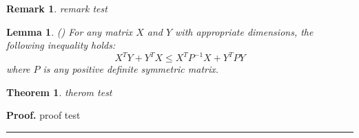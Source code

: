 \documentclass{ieeeaccess}%
\newtheorem{theorem}{Theorem}
\newtheorem{lemma}{Lemma}
\newtheorem{remark}{Remark}
\newenvironment{proof}[1][Proof]{\noindent\textbf{#1.} }{\ \rule{0.5em}{0.5em}}
\begin{document}
\begin{remark}
remark test
\end{remark}

\begin{lemma}
(\cite{lemma}) For any matrix $X$ and $Y$ with appropriate dimensions, the
following inequality holds:%
\begin{equation}
X^{T}Y+Y^{T}X\leq X^{T}P^{-1}X+Y^{T}PY \label{lemma inequality}%
\end{equation}
where $P$ is any positive definite symmetric matrix.
\end{lemma}

\begin{theorem}
therom test
\end{theorem}

\begin{proof}
proof test
\end{proof}


\EOD
\end{document}
